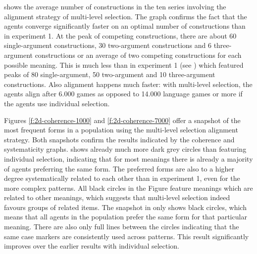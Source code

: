  
 shows the average number of constructions in the ten series involving the alignment strategy of multi-level selection. The graph confirms the fact that the agents converge significantly faster on an optimal number of constructions than in experiment 1. At the peak of competing constructions, there are about 60 single-argument constructions, 30 two-argument constructions and 6 three-argument constructions or an average of two competing constructions for each possible meaning. This is much less than in experiment 1 (see ) which featured peaks of 80 single-argument, 50 two-argument and 10 three-argument constructions. Also alignment happens much faster: with multi-level selection, the agents align after 6.000 games as opposed to 14.000 language games or more if the agents use individual selection.

\largerpage[-2]
Figures \ref{f:2d-coherence-1000} and \ref{f:2d-coherence-7000} offer a snapshot of the most frequent forms in a population using the multi-level selection alignment strategy. Both snapshots confirm the results indicated by the coherence and systematicity graphs.  shows already much more dark grey circles than  featuring individual selection, indicating that for most meanings there is already a majority of agents preferring the same form. The preferred forms are also to a higher degree systematically related to each other than in experiment 1, even for the more complex patterns. All black circles in the Figure feature meanings which are related to other meanings, which suggests that multi-level selection indeed favours groups of related items. The snapshot in  only shows black circles, which means that all agents in the population prefer the same form for that particular meaning. There are also only full lines between the circles indicating that the same case markers are consistently used across patterns. This result significantly improves over the earlier results with individual selection.

